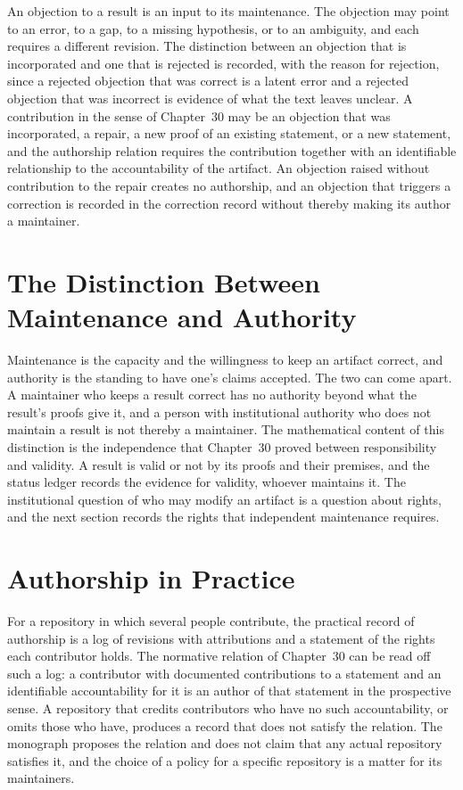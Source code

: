 \documentclass[11pt,letterpaper]{report}
\theoremstyle{plain}
\theoremstyle{definition}
\theoremstyle{remark}
\begin{document}
An objection to a result is an input to its maintenance. The objection may point to an error, to a gap, to a missing hypothesis, or to an ambiguity, and each requires a different revision. The distinction between an objection that is incorporated and one that is rejected is recorded, with the reason for rejection, since a rejected objection that was correct is a latent error and a rejected objection that was incorrect is evidence of what the text leaves unclear. A contribution in the sense of Chapter~30 may be an objection that was incorporated, a repair, a new proof of an existing statement, or a new statement, and the authorship relation requires the contribution together with an identifiable relationship to the accountability of the artifact. An objection raised without contribution to the repair creates no authorship, and an objection that triggers a correction is recorded in the correction record without thereby making its author a maintainer.

\section{The Distinction Between Maintenance and Authority}

Maintenance is the capacity and the willingness to keep an artifact correct, and authority is the standing to have one's claims accepted. The two can come apart. A maintainer who keeps a result correct has no authority beyond what the result's proofs give it, and a person with institutional authority who does not maintain a result is not thereby a maintainer. The mathematical content of this distinction is the independence that Chapter~30 proved between responsibility and validity. A result is valid or not by its proofs and their premises, and the status ledger records the evidence for validity, whoever maintains it. The institutional question of who may modify an artifact is a question about rights, and the next section records the rights that independent maintenance requires.

\section{Authorship in Practice}

For a repository in which several people contribute, the practical record of authorship is a log of revisions with attributions and a statement of the rights each contributor holds. The normative relation of Chapter~30 can be read off such a log: a contributor with documented contributions to a statement and an identifiable accountability for it is an author of that statement in the prospective sense. A repository that credits contributors who have no such accountability, or omits those who have, produces a record that does not satisfy the relation. The monograph proposes the relation and does not claim that any actual repository satisfies it, and the choice of a policy for a specific repository is a matter for its maintainers.
\end{document}

